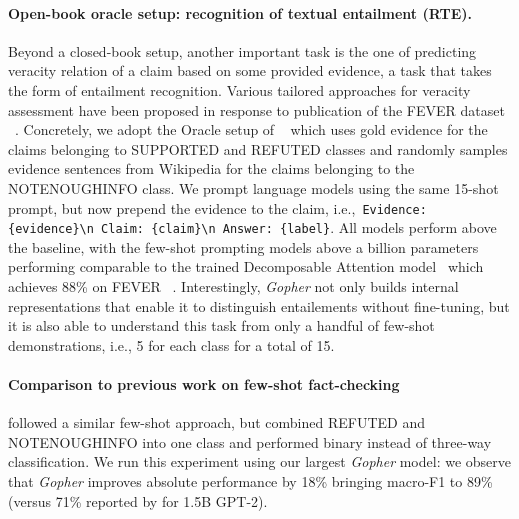 \documentclass[11pt, a4paper, logo, internal, copyright, nonumbering]{deepmind}
\newcommand{\gopher}{\textit{Gopher}\xspace}
\begin{document}
\paragraph{Open-book oracle setup: recognition of textual entailment (RTE).} Beyond a closed-book setup, another important task is the one of predicting veracity relation of a claim based on some provided evidence, a task that takes the form of entailment recognition. Various tailored approaches for veracity assessment have been proposed in response to publication of the FEVER dataset ~\citep{zhong2020reasoning, soleimani2019bert, kruengkrai2021multi}. Concretely, we adopt the Oracle setup of ~\cite{fever} which uses gold evidence for the claims belonging to SUPPORTED and REFUTED classes and randomly samples evidence sentences from Wikipedia for the claims belonging to the NOTENOUGHINFO class. We prompt language models using the same 15-shot prompt, but now prepend the evidence to the claim, i.e.,~\texttt{Evidence: \{evidence\}\textbackslash n Claim: \{claim\}\textbackslash n Answer: \{label\}}.
All models perform above the baseline, with the few-shot prompting models above a billion parameters performing comparable to the trained Decomposable Attention model~\citep{parikh2016decomposable} which achieves 88\% on FEVER ~\citep{fever}. Interestingly, \gopher not only builds internal representations that enable it to distinguish entailements without fine-tuning, but it is also able to understand this task from only a handful of few-shot demonstrations, i.e., 5 for each class for a total of 15.

\paragraph{Comparison to previous work on few-shot fact-checking}
\citet{Lee:etal:2021} followed a similar few-shot approach, but combined REFUTED and NOTENOUGHINFO into one class and performed binary instead of three-way classification. We run this experiment using our largest \gopher model: we observe that \gopher improves absolute performance by 18\% bringing macro-F1 to 89\% (versus 71\% reported by \citet{Lee:etal:2021} for 1.5B GPT-2).
\end{document}
